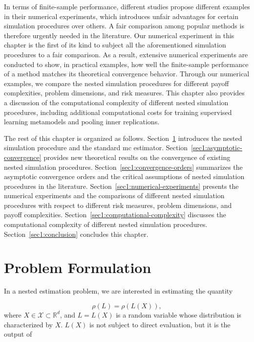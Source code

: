 In terms of finite-sample performance, different studies propose different examples in their numerical experiments, which introduces unfair advantages for certain simulation procedures over others. 
A fair comparison among popular methods is therefore urgently needed in the literature. 
Our numerical experiment in this chapter is the first of its kind to subject all the aforementioned simulation procedures to a fair comparison. 
As a result, extensive numerical experiments are conducted to show, in practical examples, how well the finite-sample performance of a method matches its theoretical convergence behavior. 
Through our numerical examples, we compare the nested simulation procedures for different payoff complexities, problem dimensions, and risk measures. 
This chapter also provides a discussion of the computational complexity of different nested simulation procedures, including additional computational costs for training supervised learning metamodels and pooling inner replications.

The rest of this chapter is organized as follows.
Section~\ref{sec1:problem-formulation} introduces the nested simulation procedure and the standard \gls{mc} estimator.
Section~\ref{sec1:asymptotic-convergence} provides new theoretical results on the convergence of existing nested simulation procedures.
Section~\ref{sec1:convergence-orders} summarizes the asymptotic convergence orders and the critical assumptions of nested simulation procedures in the literature.
Section~\ref{sec1:numerical-experiments} presents the numerical experiments and the comparisons of different nested simulation procedures with respect to different risk measures, problem dimensions, and payoff complexities.
Section~\ref{sec1:computational-complexity} discusses the computational complexity of different nested simulation procedures.
Section~\ref{sec1:conclusion} concludes this chapter.

\section{Problem Formulation}\label{sec1:problem-formulation}

In a nested estimation problem, we are interested in estimating the quantity 

$$\rho(L) = \rho(L(X)),$$
where $X \in \mathcal{X} \subset \mathbb{R}^d$, and $L = L(X)$ is a random variable whose distribution is characterized by $X$.
$L(X)$ is not subject to direct evaluation, but it is the output of 

